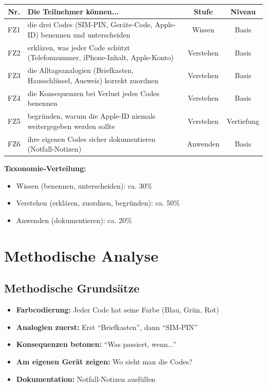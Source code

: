 \documentclass[11pt,a4paper]{article}
\begin{document}
\begin{tabular}{|c|p{7.5cm}|c|c|}
\hline
\textbf{Nr.} & \textbf{Die Teilnehmer können...} & \textbf{Stufe} & \textbf{Niveau} \\
\hline
FZ1 & die drei Codes (SIM-PIN, Geräte-Code, Apple-ID) benennen und unterscheiden & Wissen & Basis \\
\hline
FZ2 & erklären, was jeder Code schützt (Telefonnummer, iPhone-Inhalt, Apple-Konto) & Verstehen & Basis \\
\hline
FZ3 & die Alltagsanalogien (Briefkasten, Hausschlüssel, Ausweis) korrekt zuordnen & Verstehen & Basis \\
\hline
FZ4 & die Konsequenzen bei Verlust jedes Codes benennen & Verstehen & Basis \\
\hline
FZ5 & begründen, warum die Apple-ID niemals weitergegeben werden sollte & Verstehen & Vertiefung \\
\hline
FZ6 & ihre eigenen Codes sicher dokumentieren (Notfall-Notizen) & Anwenden & Basis \\
\hline
\end{tabular}

\vspace{1em}
\textbf{Taxonomie-Verteilung:}
\begin{itemize}
    \item Wissen (benennen, unterscheiden): ca. 30\%
    \item Verstehen (erklären, zuordnen, begründen): ca. 50\%
    \item Anwenden (dokumentieren): ca. 20\%
\end{itemize}

\section{Methodische Analyse}

\subsection{Methodische Grundsätze}

\begin{itemize}
    \item \textbf{Farbcodierung:} Jeder Code hat seine Farbe (Blau, Grün, Rot)
    \item \textbf{Analogien zuerst:} Erst ``Briefkasten'', dann ``SIM-PIN''
    \item \textbf{Konsequenzen betonen:} ``Was passiert, wenn...''
    \item \textbf{Am eigenen Gerät zeigen:} Wo sieht man die Codes?
    \item \textbf{Dokumentation:} Notfall-Notizen ausfüllen
\end{itemize}
\end{document}
